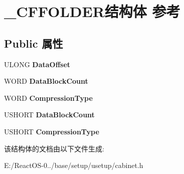 \hypertarget{struct___c_f_f_o_l_d_e_r}{}\section{\+\_\+\+C\+F\+F\+O\+L\+D\+E\+R结构体 参考}
\label{struct___c_f_f_o_l_d_e_r}
\subsection*{Public 属性}
\begin{DoxyCompactItemize}
\item 
\mbox{\label{struct___c_f_f_o_l_d_e_r_a5cd7fdd3abcaf5f7afd7f54b3487b940}} 
U\+L\+O\+NG {\bfseries Data\+Offset}
\item 
\mbox{\label{struct___c_f_f_o_l_d_e_r_a5e61c877bf7e0c57d2445d4b1c2d5132}} 
W\+O\+RD {\bfseries Data\+Block\+Count}
\item 
\mbox{\label{struct___c_f_f_o_l_d_e_r_aa3450eabe2740611e4a2a78feeb9b73c}} 
W\+O\+RD {\bfseries Compression\+Type}
\item 
\mbox{\label{struct___c_f_f_o_l_d_e_r_a15429d058fbbf9fd626fe176282efdf7}} 
U\+S\+H\+O\+RT {\bfseries Data\+Block\+Count}
\item 
\mbox{\label{struct___c_f_f_o_l_d_e_r_a5595960c1b42c26bfbeb99374bd8d309}} 
U\+S\+H\+O\+RT {\bfseries Compression\+Type}
\end{DoxyCompactItemize}


该结构体的文档由以下文件生成\+:\begin{DoxyCompactItemize}
\item 
E\+:/\+React\+O\+S-\/0../base/setup/usetup/cabinet.\+h\end{DoxyCompactItemize}

